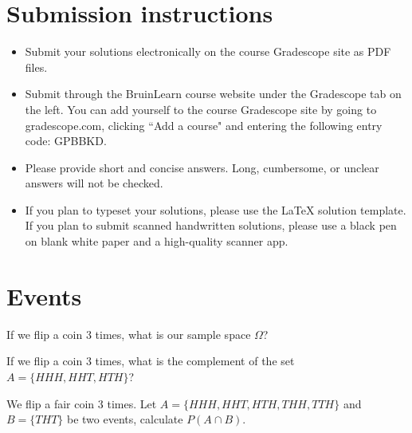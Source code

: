 \documentclass[11pt]{article}
\begin{document}

\author{}
\date{}
\maketitle
\ifsoln
\else
\section*{Submission instructions}
\begin{itemize}
\item 
Submit your solutions electronically on the course Gradescope site as PDF files.

\item 
Submit through the BruinLearn course website under the Gradescope tab on the left. You can add yourself to the course Gradescope site by going to gradescope.com, clicking ``Add a course" and entering the following entry code: GPBBKD. 

\item 
Please provide short and concise answers. Long, cumbersome, or unclear answers will not be checked.

\item 
If you plan to typeset your solutions, please use the LaTeX solution template. If you plan to submit scanned handwritten solutions, please use a black pen on blank white paper and a high-quality scanner app.
\end{itemize}

\fi

\newpage


\section{Events }
\be
\item {} If we flip a coin 3 times, what is our sample space $\Omega$?
\ifnotsolution{\vspace{4cm}}


\item {} If we flip a coin 3 times, what is the complement of the set $A = \{HHH, HHT, HTH\}$? 
\ifnotsolution{\vspace{4cm}}


\item {}
We flip a fair coin 3 times. Let $A = \{HHH, HHT, HTH, THH, TTH\}$ and $B = \{THT\}$ be two events, calculate $P(A\cap B)$.
\ifnotsolution{\vspace{3cm}}
\end{document}

